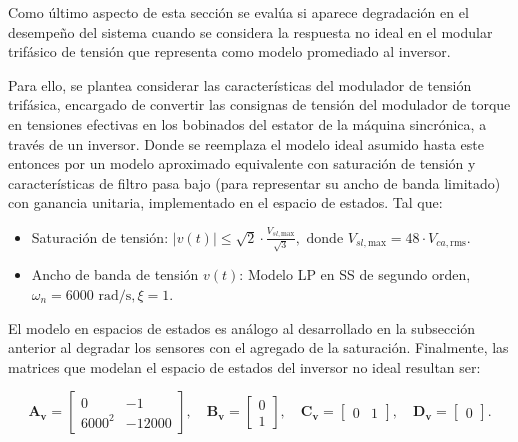 \documentclass{article}
\begin{document}
Como \'ultimo aspecto de esta secci\'on se eval\'ua si aparece degradaci\'on en el desempe\~no del sistema cuando se considera la respuesta no ideal en el modular trif\'asico de tensi\'on que representa como modelo promediado al inversor.

Para ello, se plantea considerar las caracter\'isticas del modulador de tensi\'on trif\'asica, encargado de convertir las consignas de tensi\'on del modulador de torque en tensiones efectivas en los bobinados del estator de la m\'aquina sincr\'onica, a trav\'es de un inversor. Donde se reemplaza el modelo ideal asumido hasta este entonces por un modelo aproximado equivalente con saturaci\'on de tensi\'on y caracter\'isticas de filtro pasa bajo (para representar su ancho de banda limitado) con ganancia unitaria, implementado en el espacio de estados. Tal que:

\begin{itemize}
    \item Saturaci\'on de tensi\'on: $\lvert v(t) \rvert \leq \sqrt{2} \cdot \frac{V_{sl, \text{max}}}{\sqrt{3}}, \text{ donde } V_{sl, \text{max}} = 48 \cdot V_{ca, \text{rms}}$.
    \item Ancho de banda de tensi\'on $v(t)$: Modelo LP en SS de segundo orden, $\omega_n = 6000 \text{ rad/s}, \xi = 1$.
\end{itemize}

El modelo en espacios de estados es an\'alogo al desarrollado en la subsecci\'on anterior al degradar los sensores con el agregado de la saturaci\'on. Finalmente, las matrices que modelan el espacio de estados del inversor no ideal resultan ser:

\begin{equation}
\mathbf{A_v} = \begin{bmatrix}
0 & -1 \\
6000^2 & -12000
\end{bmatrix}, \quad \mathbf{B_v} = \begin{bmatrix} 0 \\
1 \end{bmatrix}, \quad \mathbf{C_v} = \begin{bmatrix} 0 & 1 \end{bmatrix}, \quad \mathbf{D_v} = \begin{bmatrix} 0 \end{bmatrix}.
\end{equation}
\end{document}
